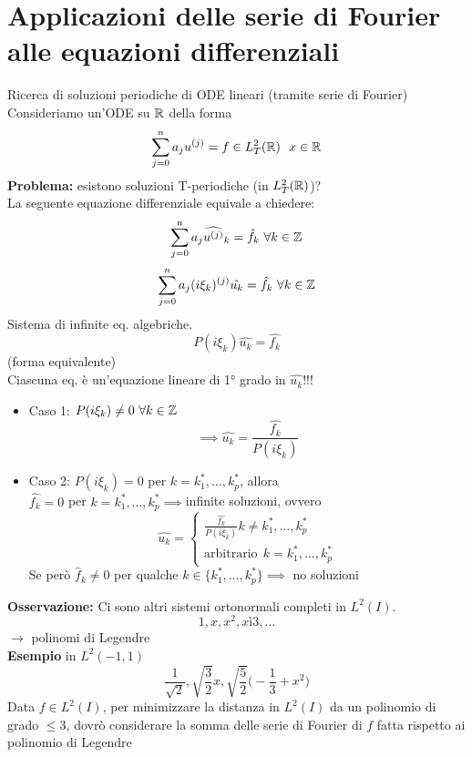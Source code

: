 \section{Applicazioni delle serie di Fourier alle equazioni differenziali}
Ricerca di soluzioni periodiche di ODE lineari (tramite serie di Fourier)
\\Consideriamo un'ODE su $\mathbb{R}$ della forma
\[\sum_{j=0}^{n} a_ju^{(j)}=f\in L^{2}_T(\R)\ \ x\in \R\]
\textbf{Problema:} esistono soluzioni T-periodiche (in $L^{2}_T(\mathbb{R})$)?
\\La seguente equazione differenziale equivale a chiedere:
\[\sum_{j=0}^{n} a_j\widehat{u^{(j)}}_k=\hat{f}_k\ \forall k\in \Z\]
\[\sum_{j=0}^{n} a_j(i\xi_k)^{(j)}\hat{u_k}=\hat{f}_k\ \forall k\in \mathbb{Z}\]
Sistema di infinite eq. algebriche.
\[P(i\xi_k)\hat{u_k}=\hat{f_k}\]
(forma equivalente)
\\Ciascuna eq. è un'equazione lineare di 1° grado in $\hat{u_k}$!!!
\begin{itemize}
	\item Caso 1: $P(i\xi_k)\neq 0\ \forall k\in \mathbb{Z}$ 
		\[\implies \hat{u_k}=\frac{\hat{f_k}}{P(i\xi_k)}\]
	\item Caso 2: $P(i\xi_k)=0$ per $k=k_1^*,\ldots,k_p^*$, allora
		\\$\hat{f_k}=0$ per $k=k_1^*,\ldots,k_p^*\implies $infinite soluzioni, ovvero
		\[\hat{u_k}=\begin{cases}
		\frac{\hat{f_k}}{P(i\xi_k)} k\neq k_1^*,\ldots,k_p^*
	\\\text{arbitrario}\ \ k=k_1^*,\ldots,k_p^*

\end{cases}\]
Se però $\hat{f}_k\neq 0$ per qualche $k\in \{k_1^*,\ldots,k^*_p\} \implies $ no soluzioni
\end{itemize}
\textbf{Osservazione:} Ci sono altri sistemi ortonormali completi in $L^{2}(I)$.
\[1,x,x^2,xì3,\ldots\]
$\to $ polinomi di Legendre\\
\textbf{Esempio} in $L^2(-1,1)$ 
\[\frac{1}{\sqrt{2} }, \sqrt{\frac{3}{2}} x, \sqrt{\frac{5}{2}} \bigg(-\frac{1}{3}+x^2\bigg)\]
Data $f\in L^{2}(I)$, per minimizzare la distanza in $L^{2}(I)$ da un polinomio di grado $\le 3$, dovrò considerare la somma delle serie di Fourier di  $f$ fatta rispetto ai polinomio di Legendre
